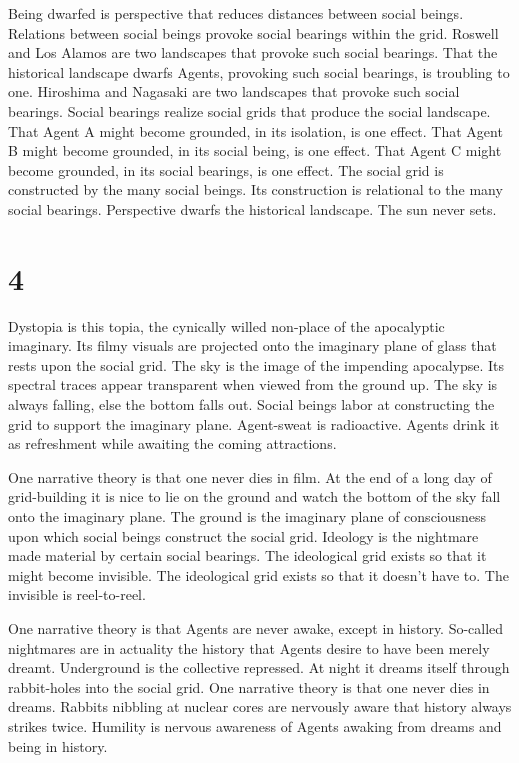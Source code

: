 \documentclass[
]{memoir}
\begin{document}
Being dwarfed is perspective that reduces distances between social
beings. Relations between social beings provoke social bearings within
the grid. Roswell and Los Alamos are two landscapes that provoke such
social bearings. That the historical landscape dwarfs Agents, provoking
such social bearings, is troubling to one. Hiroshima and Nagasaki are
two landscapes that provoke such social bearings. Social bearings
realize social grids that produce the social landscape. That Agent A
might become grounded, in its isolation, is one effect. That Agent B
might become grounded, in its social being, is one effect. That Agent C
might become grounded, in its social bearings, is one effect. The social
grid is constructed by the many social beings. Its construction is
relational to the many social bearings. Perspective dwarfs the
historical landscape. The sun never sets.

\hypertarget{section-5}{%
\section*{4}\label{section-5}}

Dystopia is this topia, the cynically willed non-place of the
apocalyptic imaginary. Its filmy visuals are projected onto the
imaginary plane of glass that rests upon the social grid. The sky is the
image of the impending apocalypse. Its spectral traces appear
transparent when viewed from the ground up. The sky is always falling,
else the bottom falls out. Social beings labor at constructing the grid
to support the imaginary plane. Agent-sweat is radioactive. Agents drink
it as refreshment while awaiting the coming attractions.

One narrative theory is that one never dies in film. At the end of a
long day of grid-building it is nice to lie on the ground and watch the
bottom of the sky fall onto the imaginary plane. The ground is the
imaginary plane of consciousness upon which social beings construct the
social grid. Ideology is the nightmare made material by certain social
bearings. The ideological grid exists so that it might become invisible.
The ideological grid exists so that it doesn't have to. The invisible is
reel-to-reel.

One narrative theory is that Agents are never awake, except in history.
So-called nightmares are in actuality the history that Agents desire to
have been merely dreamt. Underground is the collective repressed. At
night it dreams itself through rabbit-holes into the social grid. One
narrative theory is that one never dies in dreams. Rabbits nibbling at
nuclear cores are nervously aware that history always strikes twice.
Humility is nervous awareness of Agents awaking from dreams and being in
history.
\end{document}
